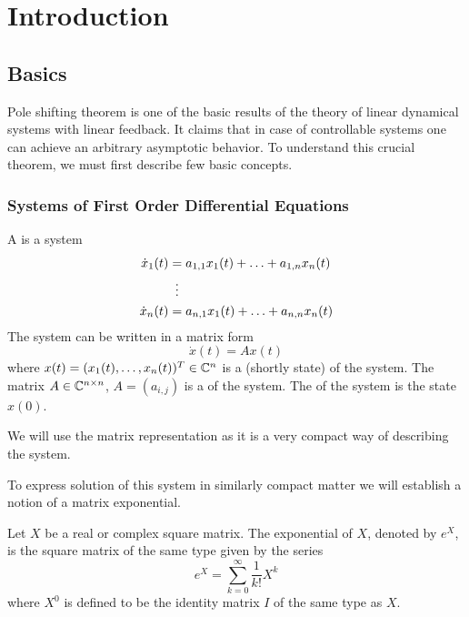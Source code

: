 \chapter{Introduction}
\label{chap:intr}

\section{Basics}
\label{sec:basics}

Pole shifting theorem is one of the basic results of the theory of linear dynamical systems with linear feedback. It claims that in case of controllable systems one can achieve an arbitrary asymptotic behavior. To understand this crucial theorem, we must first describe few basic concepts.

\subsection{Systems of First Order Differential Equations}

\begin{definition}
	A  is a system 
	\begin{align*}
		\dot{x}_1(t)&=a_{1,1}x_1(t)+\ldots+a_{1,n}x_n(t) \\
		&\vdotswithin{=} \\
		\dot{x}_n(t)&=a_{n,1}x_1(t)+\ldots+a_{n,n}x_n(t) 
	\end{align*}
	The system can be written in a matrix form $$\dot{x}(t)=Ax(t)$$ where $x(t)=(x_1(t),\ldots,x_n(t))^T \in \mathbb{C}^n$ is a  (shortly state) of the system. The matrix $A\in \mathbb{C}^{n\times n}$, $A=(a_{i,j})$ is a  of the system. The  of the system is the state $x(0)$.
\end{definition}

We will use the matrix representation as it is a very compact way of describing the system.

To express solution of this system in similarly compact matter we will establish a notion of a matrix exponential.

\begin{definition}
	Let $X$ be a real or complex square matrix. The exponential of $X$, denoted by $e^X$, is the square matrix of the same type given by the series $$e^{X}=\sum _{k=0}^{\infty}\frac{1}{k!}X^{k}$$
	where $X^0$ is defined to be the identity matrix $I$ of the same type as $X$.
\end{definition}

